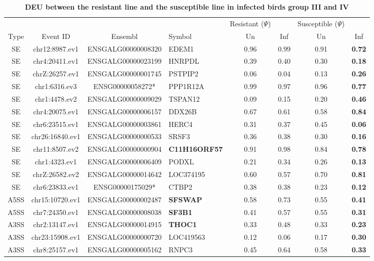 \documentclass[10pt]{article}
\begin{document}
\begin{table}[!ht]
\caption{
\bf{DEU between the resistant line and the susceptible line in infected birds group III and IV}}
\begin{tabular}{cccp{2cm}cccc}
\hline
& & & & Resistant ($\Psi$) & & Susceptible ($\Psi$) & \\
Type & Event ID & Ensembl & Symbol  & Un & Inf & Un & Inf \\
\hline
SE & chr12:8987.ev1 & ENSGALG00000008320 & EDEM1 & 0.96 & 0.99 & 0.91 & \textbf{0.72} \\
SE & chr4:20411.ev1 & ENSGALG00000023199 & HNRPDL & 0.39 & 0.40 & 0.30 & \textbf{0.18} \\
SE & chrZ:26257.ev1 & ENSGALG00000001745 & PSTPIP2 & 0.06 & 0.04 & 0.13 & \textbf{0.26} \\
SE & chr1:6316.ev3 & ENSG00000058272* & PPP1R12A & 0.99 & 0.97 & 0.96 & \textbf{0.77} \\
SE & chr1:4478.ev2 & ENSGALG00000009029 & TSPAN12 & 0.09 & 0.15 & 0.20 & \textbf{0.46} \\
SE & chr4:20075.ev1 & ENSGALG00000006157 & DDX26B & 0.67 & 0.61 & 0.58 & \textbf{0.84} \\
SE & chr6:23515.ev1 & ENSGALG00000003861 & HERC4 & 0.31 & 0.37 & 0.45 & \textbf{0.06} \\
SE & chr26:16840.ev1 & ENSGALG00000000533 & SRSF3 & 0.36 & 0.38 & 0.30 & \textbf{0.16} \\
SE & chr11:8507.ev2 & ENSGALG00000000904 & \textbf{C11H16ORF57} & 0.91 & 0.98 & 0.84 & \textbf{0.78} \\
SE & chr1:4323.ev1 & ENSGALG00000006409 & PODXL & 0.21 & 0.34 & 0.26 & \textbf{0.13} \\
SE & chrZ:26582.ev2 & ENSGALG00000014642 & LOC374195 & 0.60 & 0.57 & 0.70 & \textbf{0.81} \\
SE & chr6:23833.ev1 & ENSG00000175029* & CTBP2 & 0.38 & 0.38 & 0.23 & \textbf{0.12} \\
A5SS & chr15:10720.ev1 & ENSGALG00000002487 & \textbf{SFSWAP} & 0.58 & 0.73 & 0.55 & \textbf{0.41} \\
A5SS & chr7:24350.ev1 & ENSGALG00000008038 & \textbf{SF3B1} & 0.41 & 0.57 & 0.55 & \textbf{0.31} \\
A3SS & chr2:13147.ev1 & ENSGALG00000014915 & \textbf{THOC1} & 0.33 & 0.48 & 0.33 & \textbf{0.23} \\
A3SS & chr23:15908.ev1 & ENSGALG00000000720 & LOC419563 & 0.12 & 0.06 & 0.17 & \textbf{0.30} \\
A3SS & chr8:25157.ev1 & ENSGALG00000005162 & RNPC3 & 0.45 & 0.64 & 0.58 & \textbf{0.33} \\

\end{tabular}
\end{table}
\end{document}
